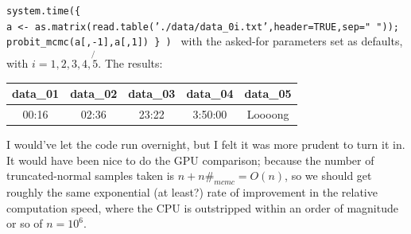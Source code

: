\documentclass[12pt,letterpaper]{article}
\begin{document}
\begin{enumerate}[a.]
\texttt{system.time(\{ \\
a <- as.matrix(read.table('./data/data\_0i.txt',header=TRUE,sep=" ")); \\
probit\_mcmc(a[,-1],a[,1]) \} ) } with the asked-for parameters set as defaults, with $i = 1,2,3,4,\not{5}$. The results:

\begin{center}
\begin{tabular}{|c|c|c|c|c|}
\hline 
data\_01 & data\_02 & data\_03 & data\_04 & data\_05 \\ 
\hline 
00:16  & 02:36 & 23:22 & 3:50:00 & Loooong \\ 
\hline 
\end{tabular} 
\end{center}

I would've let the code run overnight, but I felt it was more prudent to turn it in. It would have been nice to do the GPU comparison; because the number of truncated-normal samples taken is $n + n \#_{mcmc} = O(n)$, so we should get roughly the same exponential (at least?) rate of improvement in the relative computation speed, where the CPU is outstripped within an order of magnitude or so of $n = 10^6$.


\end{enumerate}


\pagebreak
%
\end{document}
